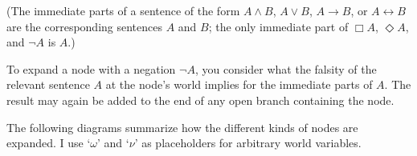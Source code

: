 (The immediate parts of a sentence of the form $A\land B$, $A \lor B$,
$A \to B$, or $A \leftrightarrow B$ are the corresponding sentences $A$ and $B$;
the only immediate part of $\Box A$, $\Diamond A$, and $\neg A$ is $A$.)

To expand a node with a negation $\neg A$, you consider what the falsity of the
relevant sentence $A$ at the node's world implies for the immediate parts of
$A$. The result may again be added to the end of any open branch containing the
node.

The following diagrams summarize how the different kinds of nodes are expanded.
I use `$\omega$' and `$\nu$' as placeholders for arbitrary world variables.


\bigskip\noindent%
\begin{minipage}{0.33\textwidth}\centering
{}
\end{minipage}
\begin{minipage}{0.33\textwidth}\centering
{}
\end{minipage}
\begin{minipage}{0.33\textwidth}\centering
{}
\end{minipage}


